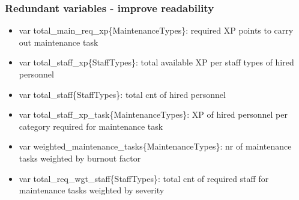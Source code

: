       \subsubsection{Redundant variables - improve readability}
        \begin{itemize}
          \item var total\_main\_req\_xp\{MaintenanceTypes\}: required XP points to carry out maintenance task
          \item var total\_staff\_xp\{StaffTypes\}: total available XP per staff types of hired personnel
          \item var total\_staff\{StaffTypes\}: total cnt of hired personnel
          \item var total\_staff\_xp\_task\{MaintenanceTypes\}: XP of hired personnel per category required for maintenance task
          \item var weighted\_maintenance\_tasks\{MaintenanceTypes\}: nr of maintenance tasks weighted by burnout factor
          \item var total\_req\_wgt\_staff\{StaffTypes\}: total cnt of required staff for maintenance tasks weighted by severity
        \end{itemize}
        
